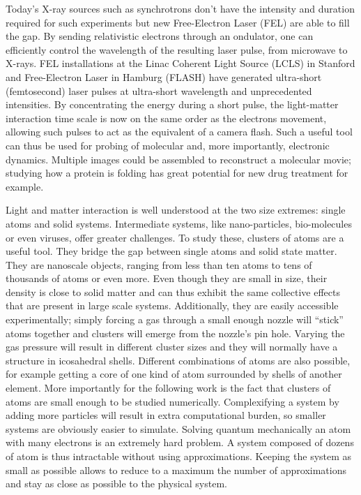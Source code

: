 Today's X-ray sources such as synchrotrons don't have the intensity and
duration required for such experiments but new Free-Electron Laser (FEL) are
able to fill the gap. By sending relativistic electrons through an ondulator,
one can efficiently control the wavelength of the resulting laser pulse, from
microwave to X-rays. FEL installations at the Linac Coherent Light Source
(LCLS) in Stanford and Free-Electron Laser in Hamburg (FLASH) have generated
ultra-short (femtosecond) laser pulses at ultra-short wavelength and
unprecedented intensities. By concentrating the energy during a short pulse,
the light-matter interaction time scale is now on the same order as the
electrons movement, allowing such pulses to act as the equivalent of a camera
flash. Such a useful tool can thus be used for probing of molecular
and, more importantly, electronic dynamics\cite{Chapman2011}. Multiple
images could be assembled
to reconstruct a molecular movie; studying how a protein is folding has great
potential for new drug treatment for example.

Light and matter interaction is well understood at the two size extremes:
single atoms and solid systems. Intermediate systems, like nano-particles,
bio-molecules or even viruses\cite{Seibert2011}, offer greater challenges. To
study these, clusters of atoms are
a useful tool. They bridge the gap between single atoms and solid state
matter. They are nanoscale objects, ranging from less than ten atoms to tens of
thousands of atoms or even more. Even though they are small in size, their
density is close to solid matter and can thus exhibit the same collective
effects that are present in large scale systems. Additionally, they are easily
accessible experimentally; simply forcing a gas through a small enough nozzle
will ``stick'' atoms together and clusters will emerge from the nozzle's pin
hole. Varying the gas pressure will result in different cluster sizes
and they will normally have a structure in icosahedral shells.
Different combinations of atoms are also possible, for example getting a core of
one kind of atom surrounded by shells of another element. More importantly for
the following work is the fact that clusters of atoms are small enough to be
studied numerically. Complexifying a system by adding more particles will
result in extra computational burden, so smaller systems are obviously easier
to simulate. Solving quantum mechanically an atom with many electrons is an
extremely hard problem. A system composed of dozens of atom is thus intractable
without using approximations. Keeping the system as small as possible allows to
reduce to a maximum the number of approximations and stay as close as possible
to the physical system.

